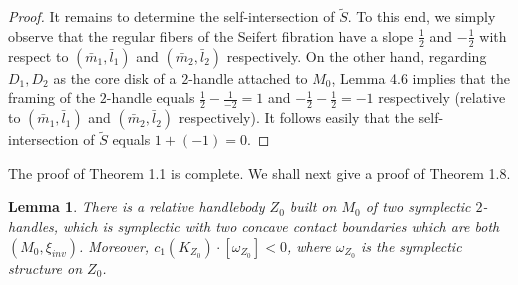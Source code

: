 \documentclass[11pt]{amsart}
\theoremstyle{plain}
\numberwithin{theorem}{section}
\newtheorem{lemma}[theorem]{Lemma}
\theoremstyle{definition}
\begin{document}
\begin{proof}
It remains to determine the self-intersection of $\tilde{S}$. To this end, we simply observe that
the regular fibers of the Seifert fibration have a slope $\frac{1}{2}$ and $-\frac{1}{2}$ with respect to 
$(\bar{m}_1,\bar{l}_1)$ and $(\bar{m}_2,\bar{l}_2)$ respectively. On the other hand, regarding
$D_1,D_2$ as the core disk of a $2$-handle attached to $M_0$, Lemma 4.6 implies that the framing of
the $2$-handle equals $\frac{1}{2}-\frac{1}{-2}=1$ and $-\frac{1}{2}-\frac{1}{2}=-1$ respectively
(relative to $(\bar{m}_1,\bar{l}_1)$ and $(\bar{m}_2,\bar{l}_2)$ respectively). It follows easily that 
the self-intersection of $\tilde{S}$ equals $1+(-1)=0$. 

\end{proof}

The proof of Theorem 1.1 is complete. We shall next give a proof of Theorem 1.8.

\begin{lemma}
There is a relative handlebody $Z_0$ built on $M_0$ of two symplectic $2$-handles, which is symplectic with two concave contact boundaries which are both $(M_0,\xi_{inv})$. Moreover,
$c_1(K_{Z_0})\cdot [\omega_{Z_0}]<0$, where $\omega_{Z_0}$ is the symplectic structure on $Z_0$. 

\end{lemma}
\end{document}
